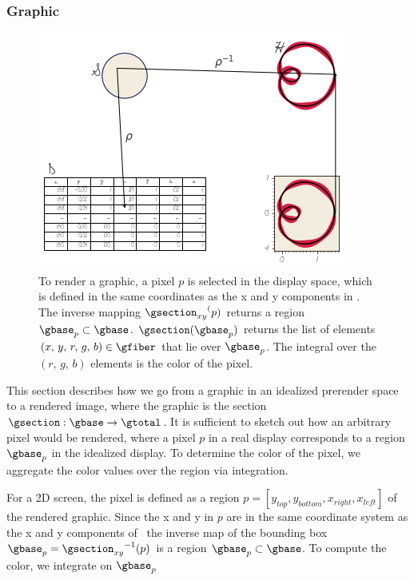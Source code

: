 \documentclass[../main.tex]{subfiles}
\begin{document}
\subsubsection{Graphic \gsection}
\label{sec:graphic_section}
\begin{figure}[H]
    \includegraphics[width=\textwidth]{figures/math/render.png}
    \caption{To render a graphic, a pixel $p$ is selected in the display space, which is defined in the same coordinates as the x and y components in \gfiber.  The inverse mapping ${\gsection_{xy}}^(p)$ returns a region $\gbase_{p} \subset \gbase$. $\gsection(\gbase_{p})$ returns the list of elements $(x,\,y,\,r,\,g,\,b) \in \gfiber$ that lie over $\gbase_{p}$. The integral over the $(r,\,g,\,b)$ elements is the color of the pixel.}
    \label{fig:graphic_rho_lookup}
\end{figure}

This section describes how we go from a graphic in an idealized prerender space to a rendered image, where the graphic is the section $\gsection: \gbase \rightarrow \gtotal$. It is sufficient to sketch out how an arbitrary pixel would be rendered, where a pixel $p$ in a real display corresponds to a region $\gbase_p$ in the idealized display. To determine the color of the pixel, we aggregate the color values over the region via integration. 

For a 2D screen, the pixel is defined as a region $p=\left[y_{top}, y_{bottom}, x_{right}, x_{left}\right]$ of the rendered graphic. Since the x and y in $p$ are in the same coordinate system as the x and y components of \gfiber\,  the inverse map of the bounding box $\gbase_{p} ={\gsection_{xy}}^{-1}(p)$ is a region $\gbase_p \subset \gbase$. To compute the color, we integrate on $\gbase_p$
\end{document}
